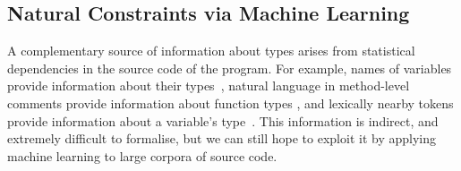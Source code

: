 \documentclass[acmsmall,nonacm]{acmart}\settopmatter{printfolios=true,printccs=false,printacmref=false}
\newcommand{\qqpi}[2]{[\![#2]\!]_{#1}}
\begin{document}



\subsection{Natural Constraints via Machine Learning}\label{ssec:natcon}

A complementary source of information about types arises from statistical dependencies
in the source code of the program.  For example, names of variables provide
information about their types~\cite{xu16}, natural language in
method-level comments provide information about function types \cite{malik19},
and lexically nearby tokens provide information
about a variable's type~\cite{wei20,hellendoorn18}.
This information is indirect, and extremely difficult to formalise,
but we can still hope to exploit it by applying machine learning
to large corpora of source code.
\end{document}
